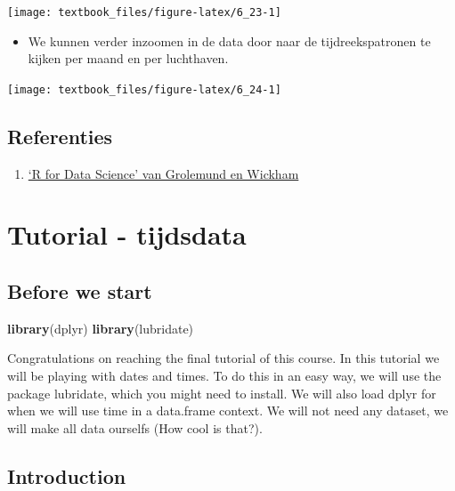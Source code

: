 \documentclass[]{tufte-book}
\newenvironment{Shaded}{}{}
\newcommand{\KeywordTok}[1]{\textcolor[rgb]{0.00,0.44,0.13}{\textbf{#1}}}
\newcommand{\NormalTok}[1]{#1}
\providecommand{\tightlist}{%
  \setlength{\itemsep}{0pt}\setlength{\parskip}{0pt}}
\begin{document}
\texttt{[image: textbook\_files/figure-latex/6\_23-1]}

\begin{itemize}
\tightlist
\item
  We kunnen verder inzoomen in de data door naar de tijdreekspatronen te kijken per maand en per luchthaven.
\end{itemize}

\texttt{[image: textbook\_files/figure-latex/6\_24-1]}

\hypertarget{referenties-5}{%
\section{Referenties}\label{referenties-5}}

\begin{enumerate}
\def\labelenumi{\arabic{enumi}.}
\tightlist
\item
  \href{http://r4ds.had.co.nz/}{`R for Data Science' van Grolemund en Wickham}
\end{enumerate}

\hypertarget{tutorial---tijdsdata}{%
\chapter{Tutorial - tijdsdata}\label{tutorial---tijdsdata}}

\hypertarget{before-we-start}{%
\section{Before we start}\label{before-we-start}}

\begin{Shaded}
\begin{Highlighting}[]
\KeywordTok{library}\NormalTok{(dplyr) }
\KeywordTok{library}\NormalTok{(lubridate)}
\end{Highlighting}
\end{Shaded}

Congratulations on reaching the final tutorial of this course. In this tutorial we will be playing with dates and times. To do this in an easy way, we will use the package lubridate, which you might need to install. We will also load dplyr for when we will use time in a data.frame context. We will not need any dataset, we will make all data ourselfs (How cool is that?).

\hypertarget{introduction-2}{%
\section{Introduction}\label{introduction-2}}
\end{document}
